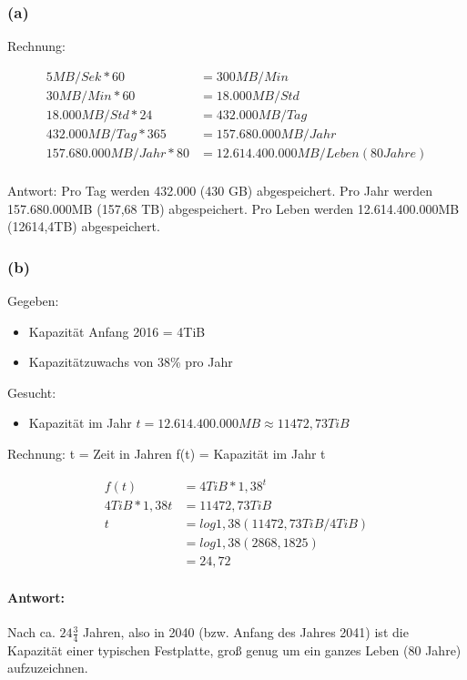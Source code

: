 \documentclass[11pt,a4paper]{article}
\begin{document}
\subsubsection{(a)} %
Rechnung:

\begin{align}
5MB/Sek*60 &= 300MB/Min\\
30MB/Min*60 &= 18.000MB/Std\\
18.000MB/Std* 24 &=  432.000MB/Tag\\
432.000MB/Tag *365 &= 157.680.000MB/Jahr\\
157.680.000MB/Jahr*80 &= 12.614.400.000MB/Leben(80 Jahre)\\
\end{align}

Antwort:
Pro Tag werden 432.000 (430 GB) abgespeichert.
Pro Jahr werden 157.680.000MB (157,68 TB) abgespeichert.
Pro Leben werden 12.614.400.000MB (12614,4TB) abgespeichert.


\subsubsection{(b)} %
Gegeben:
\begin{itemize}
    \item Kapazität Anfang 2016 = 4TiB
    \item Kapazitätzuwachs von 38\% pro Jahr
\end{itemize}

Gesucht:
\begin{itemize}
    \item Kapazität im Jahr $t = 12.614.400.000MB \approx 11472,73TiB$
\end{itemize}

Rechnung:
    t = Zeit in Jahren
    f(t) = Kapazität im Jahr t

\begin{align}
    f(t) &= 4TiB*1,38^{t}\\
    4TiB * 1,38t &= 11472,73TiB\\
    t &= log1,38(11472,73TiB/4TiB)\\
      &= log1,38(2868,1825)\\
      &= 24,72
\end{align}

\paragraph{Antwort:}
Nach ca. $24\frac{3}{4}$ Jahren, also in 2040 (bzw. Anfang des Jahres 2041) ist die Kapazität einer typischen Festplatte, groß genug um ein ganzes Leben (80 Jahre) aufzuzeichnen.
\end{document}
